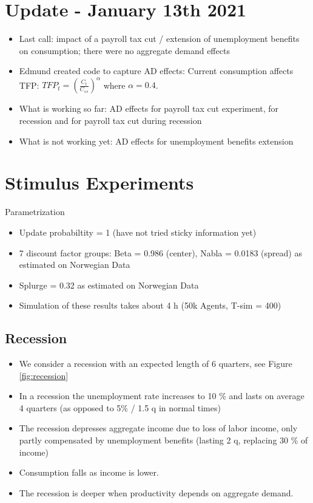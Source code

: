 \documentclass[]{article}
\begin{document}
\section{Update - January 13th 2021}
\begin{itemize}
	\item Last call: impact of a payroll tax cut / extension of unemployment benefits on consumption; there were no aggregate demand effects
	\item Edmund created code to capture AD effects: Current consumption affects TFP: $TFP_t = \left(\frac{C_t}{C_{ss}}\right)^\alpha$ where $\alpha = 0.4$.
	\item What is working so far: AD effects for payroll tax cut experiment, for recession and for payroll tax cut during recession
	\item What is not working yet: AD effects for unemployment benefits extension
\end{itemize}

\section{Stimulus Experiments}

Parametrization
\begin{itemize}
	\item Update probabiltity = 1 (have not tried sticky information yet)
	\item 7 discount factor groups: Beta = 0.986 (center), Nabla = 0.0183 (spread) as estimated on Norwegian Data
	\item Splurge = 0.32 as estimated on Norwegian Data
	\item Simulation of these results takes about 4 h (50k Agents, T-sim = 400)
\end{itemize}	

\subsection{Recession}

\begin{itemize}
	\item We consider a recession with an expected length of 6 quarters, see Figure \ref{fig:recession}
	\item In a recession the unemployment rate increases to 10 \% and lasts on average 4 quarters (as opposed to 5\% / 1.5 q in normal times)
	\item The recession depresses aggregate income due to loss of labor income, only partly compensated by unemployment benefits (lasting 2 q, replacing 30 \% of income)
	\item Consumption falls as income is lower.
	\item The recession is deeper when productivity depends on aggregate demand.
\end{itemize}
\end{document}
